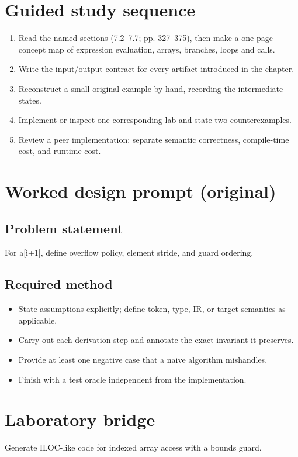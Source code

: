 \documentclass[10pt,letterpaper]{article}
\begin{document}
\section{Guided study sequence}
\begin{enumerate}
\item Read the named sections (7.2--7.7; pp. 327--375), then make a one-page concept map of expression evaluation, arrays, branches, loops and calls.
\item Write the input/output contract for every artifact introduced in the chapter.
\item Reconstruct a small original example by hand, recording the intermediate states.
\item Implement or inspect one corresponding lab and state two counterexamples.
\item Review a peer implementation: separate semantic correctness, compile-time cost, and runtime cost.
\end{enumerate}

\section{Worked design prompt (original)}
\subsection{Problem statement}
For a[i+1], define overflow policy, element stride, and guard ordering.
\subsection{Required method}
\begin{itemize}
\item State assumptions explicitly; define token, type, IR, or target semantics as applicable.
\item Carry out each derivation step and annotate the exact invariant it preserves.
\item Provide at least one negative case that a naive algorithm mishandles.
\item Finish with a test oracle independent from the implementation.
\end{itemize}


\section{Laboratory bridge}
Generate ILOC-like code for indexed array access with a bounds guard.
\end{document}
